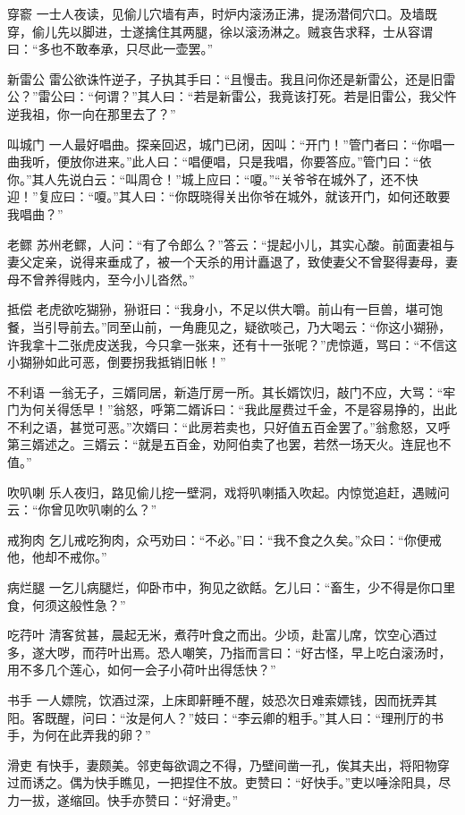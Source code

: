 \documentclass[12pt,UTF8]{ctexbook}
\begin{document}
穿窬
一士人夜读，见偷儿穴墙有声，时炉内滚汤正沸，提汤潜伺穴口。及墙既穿，偷儿先以脚进，士遂擒住其两腿，徐以滚汤淋之。贼哀告求释，士从容谓曰：“多也不敢奉承，只尽此一壶罢。”

新雷公
雷公欲诛忤逆子，子执其手曰：“且慢击。我且问你还是新雷公，还是旧雷公？”雷公曰：“何谓？”其人曰：“若是新雷公，我竟该打死。若是旧雷公，我父忤逆我祖，你一向在那里去了？”

叫城门
一人最好唱曲。探亲回迟，城门已闭，因叫：“开门！”管门者曰：“你唱一曲我听，便放你进来。”此人曰：“唱便唱，只是我唱，你要答应。”管门曰：“依你。”其人先说白云：“叫周仓！”城上应曰：“嗄。”“关爷爷在城外了，还不快迎！”复应曰：“嗄。”其人曰：“你既晓得关出你爷在城外，就该开门，如何还敢要我唱曲？”

老鳏
苏州老鳏，人问：“有了令郎么？”答云：“提起小儿，其实心酸。前面妻祖与妻父定亲，说得来垂成了，被一个天杀的用计矗退了，致使妻父不曾娶得妻母，妻母不曾养得贱内，至今小儿沓然。”

抵偿
老虎欲吃猢狲，狲诳曰：“我身小，不足以供大嚼。前山有一巨兽，堪可饱餐，当引导前去。”同至山前，一角鹿见之，疑欲啖己，乃大喝云：“你这小猢狲，许我拿十二张虎皮送我，今只拿一张来，还有十一张呢？”虎惊遁，骂曰：“不信这小猢狲如此可恶，倒要拐我抵销旧帐！”

不利语
一翁无子，三婿同居，新造厅房一所。其长婿饮归，敲门不应，大骂：“牢门为何关得恁早！”翁怒，呼第二婿诉曰：“我此屋费过千金，不是容易挣的，出此不利之语，甚觉可恶。”次婿曰：“此房若卖也，只好值五百金罢了。”翁愈怒，又呼第三婿述之。三婿云：“就是五百金，劝阿伯卖了也罢，若然一场天火。连屁也不值。”

吹叭喇
乐人夜归，路见偷儿挖一壁洞，戏将叭喇插入吹起。内惊觉追赶，遇贼问云：“你曾见吹叭喇的么？”

戒狗肉
乞儿戒吃狗肉，众丐劝曰：“不必。”曰：“我不食之久矣。”众曰：“你便戒他，他却不戒你。”

病烂腿
一乞儿病腿烂，仰卧市中，狗见之欲餂。乞儿曰：“畜生，少不得是你口里食，何须这般性急？”

吃荇叶
清客贫甚，晨起无米，煮荇叶食之而出。少顷，赴富儿席，饮空心酒过多，遂大哕，而荇叶出焉。恐人嘲笑，乃指而言曰：“好古怪，早上吃白滚汤时，用不多几个莲心，如何一会子小荷叶出得恁快？”

书手
一人嫖院，饮酒过深，上床即鼾睡不醒，妓恐次日难索嫖钱，因而抚弄其阳。客既醒，问曰：“汝是何人？”妓曰：“李云卿的粗手。”其人曰：“理刑厅的书手，为何在此弄我的卵？”

滑吏
有快手，妻颇美。邻吏每欲调之不得，乃壁间凿一孔，俟其夫出，将阳物穿过而诱之。偶为快手瞧见，一把捏住不放。吏赞曰：“好快手。”吏以唾涂阳具，尽力一拔，遂缩回。快手亦赞曰：“好滑吏。”
\end{document}
